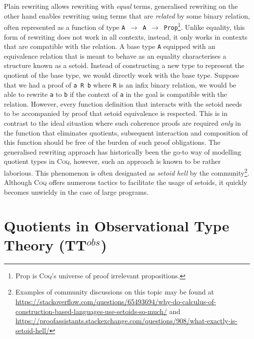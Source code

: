 \documentclass[12pt,twoside,maitrise]{dms}
\theoremstyle{definition}
\numberwithin{equation}{section}
\numberwithin{table}{chapter}
\numberwithin{figure}{chapter}
\newcommand\kw[1] {\textsf{#1}}
\newcommand\id[1] {\texttt{#1}}
\newcommand\fn[1] {\texttt{#1}}
\def\Coq{\textsc{Coq}\xspace}
\begin{document}
Plain rewriting allows rewriting with \emph{equal} terms, generalised
rewriting\cite{sozeau2009new, coq-gen-rewriting} on the other hand enables
rewriting using terms that are \emph{related} by some binary relation, often
represented as a function of type \fn{A $\rightarrow$ A $\rightarrow$
  \kw{Prop}}\footnote{\kw{Prop} is \Coq{}'s universe of proof irrelevant
propositions.}. Unlike equality, this form of rewriting does not work in all
contexts, instead, it only works in contexts that are compatible with the
relation. A base type \id{A} equipped with an equivalence relation that is meant
to behave as an equality characterises a structure known as a
setoid\cite{hofmann1995simple}. Instead of constructing a new type to represent
the quotient of the base type, we would directly work with the base type.
Suppose that we had a proof of \fn{a R b} where \id{R} is an infix binary
relation, we would be able to rewrite \id{a} to \id{b} if the context of \id{a}
in the goal is compatible with the relation. However, every function definition
that interacts with the setoid needs to be accompanied by proof that setoid
equivalence is respected. This is in contrast to the ideal situation where such
coherence proofs are required \emph{only} in the function that eliminates
quotients, subsequent interaction and composition of this function should be
free of the burden of such proof obligations. The generalised rewriting approach
has historically been the go-to way of modelling quotient types in \Coq{},
however, such an approach is known to be rather laborious. This phenomenon is
often designated as \emph{setoid hell} by the community\footnote{Examples of
community discussions on this topic may be found at
\url{https://stackoverflow.com/questions/65493694/why-do-calculus-of-construction-based-languages-use-setoids-so-much/}
and
\url{https://proofassistants.stackexchange.com/questions/908/what-exactly-is-setoid-hell/}}.
Although \Coq{} offers numerous tactics to facilitate the usage of setoids, it
quickly becomes unwieldy in the case of large programs.

\section{Quotients in Observational Type Theory (TT$^{obs}$)}

\end{document}

